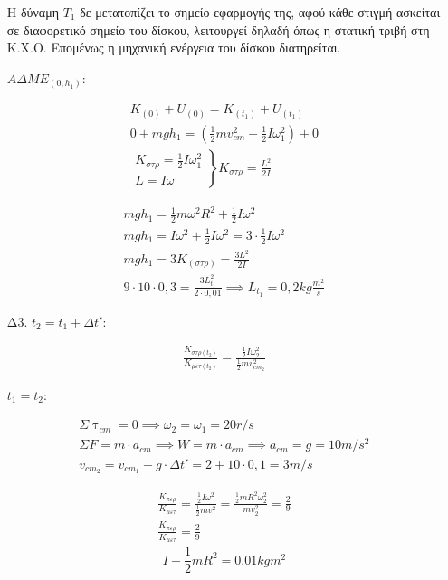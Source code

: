 \documentclass[12pt]{article}
\begin{document}
\begin{enumerate}
    Η δύναμη $T_1$ δε μετατοπίζει το σημείο εφαρμογής της, αφού κάθε στιγμή ασκείται σε διαφορετικό σημείο του δίσκου, λειτουργεί δηλαδή όπως η στατική τριβή στη Κ.Χ.Ο. Επομένως η μηχανική ενέργεια του δίσκου διατηρείται.

    $ΑΔΜΕ_{(0,h_1)}:$

    \begin{gather*}
      K_(0)+U_(0)=K_{(t_1)}+U_{(t_1)} \\
      0+mgh_1=\left( \frac{1}{2}mv_{cm}^2+\frac{1}{2}Iω_1^2\right) + 0 \\
      \left. \begin{matrix}K_{στρ}=\frac{1}{2}Iω_1^2 \\ L=Iω\end{matrix} \right\} K_{στρ}=\frac{L^2}{2I}
    \end{gather*}

    \begin{gather*}
      mgh_1=\frac{1}{2}mω^2R^2+\frac{1}{2}Iω^2 \\
      mgh_1=Iω^2+\frac{1}{2}Iω^2=3\cdot\frac{1}{2}Iω^2 \\
      mgh_1=3K_{(στρ)}=\frac{3L^2}{2I} \\
      9\cdot 10\cdot 0,3=\frac{3L_{t_1}^2}{2\cdot 0,01} \implies L_{t_1}=0,2kg \frac{m^2}{s}
    \end{gather*}

    \item [Δ3.]
    $t_2=t_1+Δt'$:

    \begin{gather*}
      \frac{K_{στρ(t_2)}}{K_{μετ(t_2)}}=\frac{\frac{1}{2}Iω_2^2}{\frac{1}{2}mv_{cm_2}^2}
    \end{gather*}

    $t_1=t_2$:

    \begin{gather*}
      Σ\uptau_{cm}=0\implies ω_2=ω_1=20r/s \\
      ΣF=m\cdot a_{cm}\implies W=m\cdot a_{cm}\implies a_{cm}=g=10 m/s^2 \\
      v_{cm_2}=v_{cm_1}+g\cdot Δt'=2+10\cdot 0,1=3m/s
    \end{gather*}

    \begin{gather*}
      \frac{K_{περ}}{K_{μετ}}=\frac{\frac{1}{2}Iω^2}{\frac{1}{2}mv^2}=\frac{\frac{1}{2}mR^2ω_2^2}{mv_2^2}=\frac{2}{9} \\
      \frac{K_{περ}}{K_{μετ}}=\frac{2}{9}
    \end{gather*}
    $$I+\frac{1}{2}mR^2=0.01kgm^2$$

  \end{enumerate}
\end{document}
